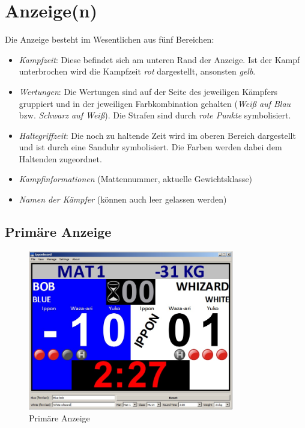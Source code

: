 ﻿\documentclass[11pt,numbers=noenddot]{scrreprt}
\begin{document}
\section{Anzeige(n)}
Die Anzeige besteht im Wesentlichen aus fünf Bereichen:
\begin{itemize}
	\item \textit{Kampfzeit}: Diese befindet sich am unteren Rand der Anzeige. Ist der Kampf unterbrochen wird die Kampfzeit \textit{rot} dargestellt, ansonsten \textit{gelb}.
	\item \textit{Wertungen}: Die Wertungen sind auf der Seite des jeweiligen Kämpfers gruppiert und in der jeweiligen Farbkombination gehalten (\textit{Weiß auf Blau} bzw.\textit{ Schwarz auf Weiß}). Die Strafen sind durch \textit{rote Punkte} symbolisiert.
	\item \textit{Haltegriffzeit}: Die noch zu haltende Zeit wird im oberen Bereich dargestellt und ist durch eine Sanduhr symbolisiert. Die Farben werden dabei dem Haltenden zugeordnet.
	\item \textit{Kampfinformationen} (Mattennummer, aktuelle Gewichtsklasse)
	\item \textit{Namen der Kämpfer} (können auch leer gelassen werden)
\end{itemize}

\subsection[Primäre Anzeige]{Primäre Anzeige}

\begin{figure}
	\centering
		\includegraphics[width=0.8\textwidth]{images/primary_view.jpg}
	\caption{Primäre Anzeige}
	\label{fig:Primary_View}
\end{figure}
\end{document}
